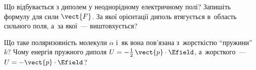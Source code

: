 \begin{Questions}
\begin{quizlist}
		\item Що відбувається з диполем у неоднорідному електричному полі? Запишіть формулу для сили $\vect{F}$. За якої орієнтації диполь втягується в~область сильного поля, а~за якої~--- виштовхується?
		\item Що таке поляризовність молекули $\alpha$ і~як вона пов'язана з~жорсткістю \enquote{пружини} $k$? Чому енергія пружного диполя $U = -\tfrac12\,\vect{p}\cdot\Efield$, а~жорсткого~--- $U = -\vect{p}\cdot\Efield$?
	\end{quizlist}
\end{Questions}

